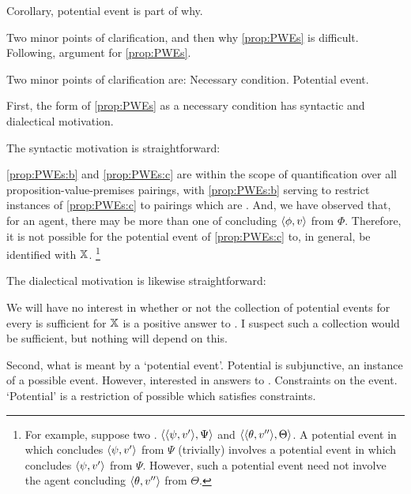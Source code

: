 \begin{note}
  Corollary, potential event is part of why.
\end{note}

\begin{note}
  Two minor points of clarification, and then why \autoref{prop:PWEs} is difficult.
  Following, argument for \autoref{prop:PWEs}.

  Two minor points of clarification are:
  Necessary condition.
  Potential event.
\end{note}

\begin{note}
  First, the form of \autoref{prop:PWEs} as a necessary condition has syntactic and dialectical motivation.

  The syntactic motivation is straightforward:
  \begin{shiftpar}
    \ref{prop:PWEs:b} and \ref{prop:PWEs:c} are within the scope of quantification over all proposition-value-premises pairings, with \ref{prop:PWEs:b} serving to restrict instances of \ref{prop:PWEs:c} to pairings which are \requ{}.
    And, we have observed that, for an agent, there may be more than one \requ{} of concluding \(\pv{\phi}{v}\) from \(\Phi\).
    Therefore, it is not possible for the potential event of \ref{prop:PWEs:c} to, in general, be identified with \(\qzSaV{}\).%
    \footnote{
      For example, suppose two .
      \(\pvp{\psi}{v'}{\Psi}\) and \(\pvp{\theta}{v''}{\Theta}\).
      A potential event in which \vAgent{} concludes \(\pv{\psi}{v'}\) from \(\Psi\) (trivially) involves a potential event in which \vAgent{} concludes \(\pv{\psi}{v'}\) from \(\Psi\).
      However, such a potential event need not involve the agent concluding \(\pv{\theta}{v''}\) from \(\Theta\).
    }
  \end{shiftpar}

  The dialectical motivation is likewise straightforward:

  \begin{shiftpar}
    We will have no interest in whether or not the collection of potential events for every \requ{} is sufficient for \(\qzSaV{}\) is a positive answer to \qzS{}.
    I suspect such a collection would be sufficient, but nothing will depend on this.
  \end{shiftpar}
\end{note}

\begin{note}
  Second, what is meant by a `potential event'.
  Potential is subjunctive, an instance of a possible event.
  However, interested in answers to \qzS{}.
  Constraints on the event.
  `Potential' is a restriction of possible which satisfies constraints.
\end{note}

